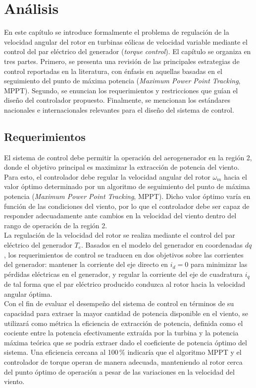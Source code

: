 \chapter{Análisis}

En este capítulo se introduce formalmente el problema de regulación de la velocidad 
angular del rotor en turbinas eólicas de velocidad variable mediante el control del 
par eléctrico del generador (\emph{torque control}). El capítulo se organiza en tres 
partes. Primero, se presenta una revisión de las principales estrategias de control 
reportadas en la literatura, con énfasis en aquellas basadas en el seguimiento del 
punto de máxima potencia (\emph{Maximum Power Point Tracking}, MPPT). Segundo, se 
enuncian los requerimientos y restricciones que guían el diseño del controlador 
propuesto. Finalmente, se mencionan los estándares nacionales e internacionales 
relevantes para el diseño del sistema de control.

\section{Requerimientos}

El sistema de control debe permitir la operación del aerogenerador en la región 2, 
donde el objetivo principal es maximizar la extracción de potencia del viento. Para 
esto, el controlador debe regular la velocidad angular del rotor $\omega_m$ hacia 
el valor óptimo determinado por un algoritmo de seguimiento del punto de máxima 
potencia (\emph{Maximum Power Point Tracking}, MPPT). Dicho valor óptimo varía en 
función de las condiciones del viento, por lo que el controlador debe ser capaz de 
responder adecuadamente ante cambios en la velocidad del viento dentro del rango 
de operación de la región 2.
\\

La regulación de la velocidad del rotor se realiza mediante el control del par 
eléctrico del generador $T_e$. Basados en el modelo del generador en coordenadas $dq$, 
los requerimientos de control se traducen en dos objetivos sobre las corrientes del 
generador: mantener la corriente del eje directo en $i_d = 0$ para minimizar las 
pérdidas eléctricas en el generador, y regular la corriente del eje de cuadratura 
$i_q$ de tal forma que el par eléctrico producido conduzca al rotor hacia la 
velocidad angular óptima.
\\

Con el fin de evaluar el desempeño del sistema de control en términos de su 
capacidad para extraer la mayor cantidad de potencia disponible en el viento, 
se utilizará como métrica la eficiencia de extracción de potencia, definida 
como el cociente entre la potencia efectivamente extraída por la turbina y la 
potencia máxima teórica que se podría extraer dado el coeficiente de potencia 
óptimo del sistema. Una eficiencia cercana al 100\,\% indicaría que el 
algoritmo MPPT y el controlador de torque operan de manera adecuada, 
manteniendo al rotor cerca del punto óptimo de operación a pesar de las 
variaciones en la velocidad del viento.


